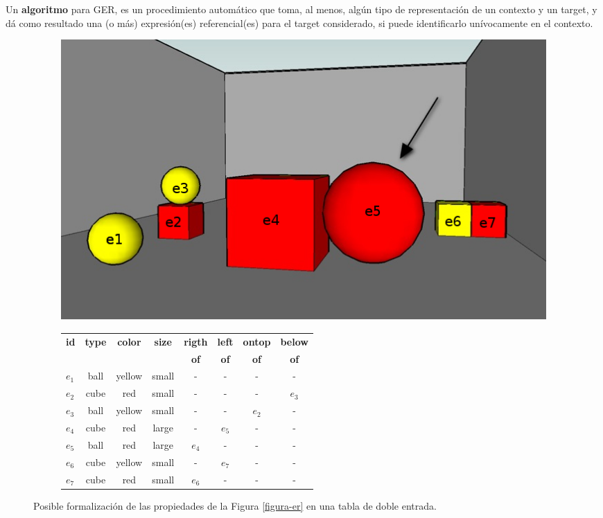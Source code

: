 Un {\bf algoritmo} para GER, es un procedimiento autom\'atico que toma, al menos, alg\'un tipo de representaci\'on de un contexto y un target, y d\'a como resultado una (o m\'as) expresi\'on(es) referencial(es) para el target considerado, si puede identificarlo un\'ivocamente en el contexto.
\vspace*{-1.5cm}
\begin{figure}[H]
\begin{subfigure}{.4\textwidth}
  \centering
	\vspace*{-.2cm}
\includegraphics[width=\textwidth]{images/22.jpg}
  \caption{}\label{GRE3D7-stimulus1-ids}
\end{subfigure}
\begin{subfigure}{1\textwidth}
 \centering
\begin{centering}
\hspace*{-6cm}
\begin{scriptsize}
\begin{tabular}{|l|c|c|c|c|c|c|c|}
\hline
\textbf {id}& 	\textbf {type}		&	\textbf {color}	&	\textbf {size}& \textbf {rigth} & \textbf {left} & \textbf {ontop}	& \textbf {below}	\\
   	   &  	    			&	    		&	     		&  \textbf {of}   		 &  \textbf {of}	    &  \textbf {of}	&  \textbf {of}\\
\hline \hline
$e_1$ & ball & yellow & small & - & - & - & - \\
$e_2$ & cube & red & small & - & - &- & $e_3$ \\
$e_3$ & ball & yellow & small & - & - & $e_2$ & -\\
$e_4$ & cube & red & large & - & $e_5$ & - & -\\
$e_5$ & ball & red & large & $e_4$ & - & - & -\\
$e_6$ & cube & yellow & small & - & $e_7$ & - & -\\
$e_7$ & cube & red & small & $e_6$ & - & - & -\\
\hline
\end{tabular}
\end{scriptsize}
\caption{}\label{tabla-propiedades}
\end{centering}
\end{subfigure}
\caption{Posible formalizaci\'on de las propiedades de la Figura \ref{figura-er} en una tabla de doble entrada.}\label{contexto-tabla-propiedades}
\end{figure}

